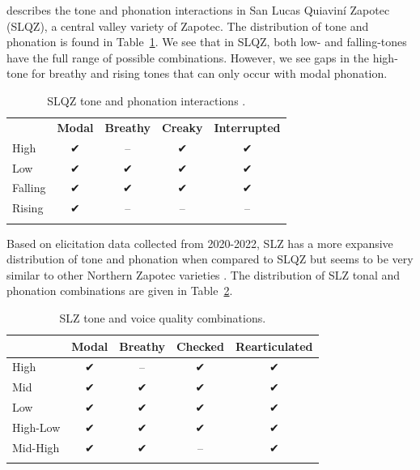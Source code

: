 \citet{chavez-peonInteractionMetricalStructure2010} describes the tone and phonation interactions in San Lucas Quiaviní Zapotec (SLQZ), a central valley variety of Zapotec. The distribution of tone and phonation is found in Table~\ref{tab:SLQZ}. We see that in SLQZ, both low- and falling-tones have the full range of possible combinations. However, we see gaps in the high-tone for breathy and rising tones that can only occur with modal phonation. 

\begin{table}[h!]
	\centering
	\caption{SLQZ tone and phonation interactions \citep{chavez-peonInteractionMetricalStructure2010}.}
	\label{tab:SLQZ}
	 \begin{tabular}{lcccc}
	  \lsptoprule
					  &	 \textbf{Modal}  & \textbf{Breathy} & \textbf{Creaky} & \textbf{Interrupted} \\
		  High	& ✔︎ & -- & ✔︎ & ✔︎ \\
		  Low & ✔︎ & ✔︎ & ✔︎ & ✔︎ \\
		  Falling & ✔︎ & ✔︎ & ✔︎ & ✔︎ \\
		  Rising & ✔︎ & -- & -- & -- \\
	  \lspbottomrule
	 \end{tabular}
\end{table}

Based on elicitation data collected from 2020-2022, SLZ has a more expansive distribution of tone and phonation when compared to SLQZ but seems to be very similar to other Northern Zapotec varieties \citep[e.g.,][]{avelinoTopicsYalalagZapotec2004}. The distribution of SLZ tonal and phonation combinations are given in Table~\ref{tab:ToneVoiceQuality}.
\begin{table}[!h]
	\caption{SLZ tone and voice quality combinations.}
	\label{tab:ToneVoiceQuality}
	\centering

	\begin{tabular}{lcccc}
	\lsptoprule
		& \textbf{Modal} & \textbf{Breathy} & \textbf{Checked} & \textbf{Rearticulated} \\
	\hline
	High		& ✔︎ & -- & ✔︎ & ✔︎ \\
	Mid			& ✔︎ & ✔︎ & ✔︎ & ✔︎ \\
	Low			& ✔︎ & ✔︎ & ✔︎ & ✔︎ \\
	High-Low	& ✔︎ & ✔︎ & ✔︎ & ✔︎ \\
	Mid-High	& ✔︎ & ✔︎ & -- & ✔︎ \\
	\lspbottomrule
	\end{tabular}
\end{table}

